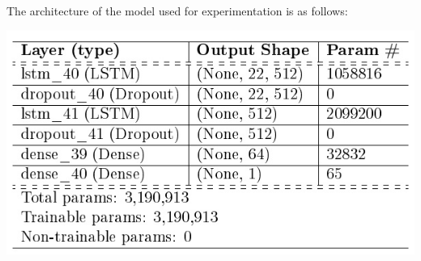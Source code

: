 The architecture of the model used for experimentation is as follows:

				\begin{center}
				\includegraphics[width=\linewidth]{figures/architecture-of-LSTM.jpg}	%
				\label{fig: The architecture of the LSTM model}
				\end{center}






